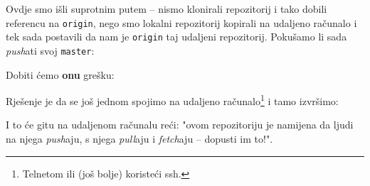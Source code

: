 Ovdje smo išli suprotnim putem -- nismo klonirali repozitorij i tako dobili referencu na \verb+origin+, nego smo lokalni repozitorij kopirali na udaljeno računalo i tek sada postavili da nam je \verb+origin+ taj udaljeni repozitorij.
Pokušamo li sada \emph{push}ati svoj \verb+master+:


Dobiti ćemo \textbf{onu} grešku:


Rješenje je da se još jednom spojimo na udaljeno računalo\footnote{Telnetom ili (još bolje) koristeći ssh.} i tamo izvršimo:


I to će gitu na udaljenom računalu reći: "ovom repozitoriju je namijena da ljudi na njega \emph{push}aju, s njega \emph{pull}aju i \emph{fetch}aju -- dopusti im to!".


